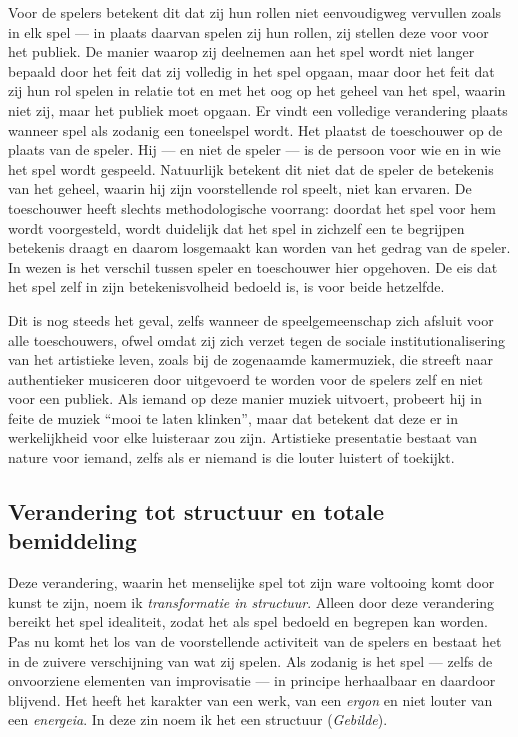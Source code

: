 Voor de spelers betekent dit dat zij hun rollen niet eenvoudigweg vervullen zoals in elk spel — in plaats daarvan spelen zij hun rollen, zij stellen deze voor voor het publiek. De manier waarop zij deelnemen aan het spel wordt niet langer bepaald door het feit dat zij volledig in het spel opgaan, maar door het feit dat zij hun rol spelen in relatie tot en met het oog op het geheel van het spel, waarin niet zij, maar het publiek moet opgaan. Er vindt een volledige verandering plaats wanneer spel als zodanig een toneelspel wordt. Het plaatst de toeschouwer op de plaats van de speler. Hij — en niet de speler — is de persoon voor wie en in wie het spel wordt gespeeld. Natuurlijk betekent dit niet dat de speler de betekenis van het geheel, waarin hij zijn voorstellende rol speelt, niet kan ervaren. De toeschouwer heeft slechts methodologische voorrang: doordat het spel voor hem wordt voorgesteld, wordt duidelijk dat het spel in zichzelf een te begrijpen betekenis draagt en daarom losgemaakt kan worden van het gedrag van de speler. In wezen is het verschil tussen speler en toeschouwer hier opgehoven. De eis dat het spel zelf in zijn betekenisvolheid bedoeld is, is voor beide hetzelfde.

Dit is nog steeds het geval, zelfs wanneer de speelgemeenschap zich afsluit voor alle toeschouwers, ofwel omdat zij zich verzet tegen de sociale institutionalisering van het artistieke leven, zoals bij de zogenaamde kamermuziek, die streeft naar authentieker musiceren door uitgevoerd te worden voor de spelers zelf en niet voor een publiek. Als iemand op deze manier muziek uitvoert, probeert hij in feite de muziek ``mooi te laten klinken'', maar dat betekent dat deze er in werkelijkheid voor elke luisteraar zou zijn. Artistieke presentatie bestaat van nature voor iemand, zelfs als er niemand is die louter luistert of toekijkt.

\subsection{Verandering tot structuur en totale bemiddeling}

Deze verandering, waarin het menselijke spel tot zijn ware voltooing komt door kunst te zijn, noem ik \textit{transformatie in structuur}. Alleen door deze verandering bereikt het spel idealiteit, zodat het als spel bedoeld en begrepen kan worden. Pas nu komt het los van de voorstellende activiteit van de spelers en bestaat het in de zuivere verschijning van wat zij spelen. Als zodanig is het spel — zelfs de onvoorziene elementen van improvisatie — in principe herhaalbaar en daardoor blijvend. Het heeft het karakter van een werk, van een \textit{ergon} en niet louter van een \textit{energeia}. In deze zin noem ik het een structuur (\textit{Gebilde}).

